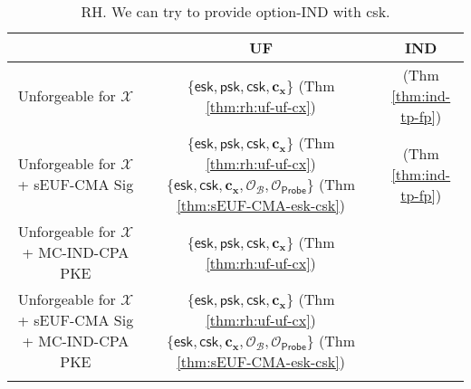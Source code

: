 


\begin{table}[ht]
\centering
\begin{tabular}{c c c} 
	
	\toprule

	& \textbf{UF} & \textbf{IND} \\
	
	\midrule

	Unforgeable for $\mathcal{X}$ & $\{ \textsf{esk}, \textsf{psk}, \textsf{csk}, \mathbf{c_x} \}$ (Thm \ref{thm:rh:uf-uf-cx}) & \xmark \; (Thm \ref{thm:ind-tp-fp}) \\
	
	\midrule
	
	\makecell{Unforgeable for $\mathcal{X}$ \\ + sEUF-CMA \textsf{Sig}} & \makecell{ $\{ \textsf{esk}, \textsf{psk}, \textsf{csk}, \mathbf{c_x} \}$ (Thm \ref{thm:rh:uf-uf-cx}) \\ $\{ \textsf{esk}, \textsf{csk}, \mathbf{c_x}, \mathcal{O}_\mathcal{B}, \mathcal{O}_{\textsf{Probe}} \}$ (Thm \ref{thm:sEUF-CMA-esk-csk}) } & \xmark \; (Thm \ref{thm:ind-tp-fp}) \\
	
	\midrule
	
	\makecell{ Unforgeable for $\mathcal{X}$ \\+ MC-IND-CPA \textsf{PKE}} & $\{ \textsf{esk}, \textsf{psk}, \textsf{csk}, \mathbf{c_x} \}$ (Thm \ref{thm:rh:uf-uf-cx}) & \makecell{$\{ \textsf{esk}, \textsf{psk}, \mathbf{c_x}, \mathcal{O}_{\mathbf{c_y}} \}$ (Thm \ref{thm:mc-ind-cpa:ind-esk-psk})} \\
	
	\midrule
	
	\makecell{Unforgeable for $\mathcal{X}$ \\ + sEUF-CMA \textsf{Sig} \\ + MC-IND-CPA \textsf{PKE}} & \makecell{ $\{ \textsf{esk}, \textsf{psk}, \textsf{csk}, \mathbf{c_x} \}$ (Thm \ref{thm:rh:uf-uf-cx}) \\ $\{ \textsf{esk}, \textsf{csk}, \mathbf{c_x}, \mathcal{O}_\mathcal{B}, \mathcal{O}_{\textsf{Probe}} \}$ (Thm \ref{thm:sEUF-CMA-esk-csk}) }  & \makecell{$\{ \textsf{esk}, \textsf{psk}, \mathbf{c_x}, \mathcal{O}_{\mathbf{c_y}} \}$ (Thm \ref{thm:mc-ind-cpa:ind-esk-psk})} \\
	
	\bottomrule

\medskip
\end{tabular}
\caption{RH. We can try to provide \textsf{option}-IND with \textsf{csk}.}
\label{table:rh}
\end{table}


